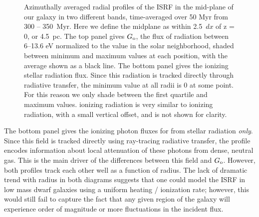 \documentclass[twocolumn]{aastex61}
\begin{document}
\begin{figure}
{Azimuthally averaged radial profiles of the ISRF in the mid-plane of our galaxy in two different bands, time-averaged over 50 Myr from 300 -- 350~Myr. Here we define the midplane as within 2.5~$dx$ of z = 0, or 4.5~pc. The top panel gives $G_{\rm o}$, the flux of radiation between 6--13.6 eV normalized to the value in the solar neighborhood, shaded between minimum and maximum values at each position, with the average shown as a black line. The bottom panel gives the  ionizing stellar radiation flux. Since this radiation is tracked directly through radiative transfer, the minimum value at all radii is 0 at some point. For this reason we only shade between the first quartile and maximum values.  ionizing radiation is very similar to  ionizing radiation, with a small vertical offset, and is not shown for clarity.}
\label{fig:ISRF}
\end{figure}

The bottom panel gives the ionizing photon fluxes for  from stellar radiation {\em only}. Since this field is tracked directly using ray-tracing radiative transfer, the profile encodes information about local attenuation of these photons from dense, neutral gas. This is the main driver of the differences between this field and $G_{\rm o}$. However, both profiles track each other well as a function of radius. The lack of dramatic trend with radius in both diagrams suggests that one could model the ISRF in low mass dwarf galaxies using a uniform heating / ionization rate; however, this would still fail to capture the fact that any given region of the galaxy will experience order of magnitude or more fluctuations in the incident flux. 
\end{document}
